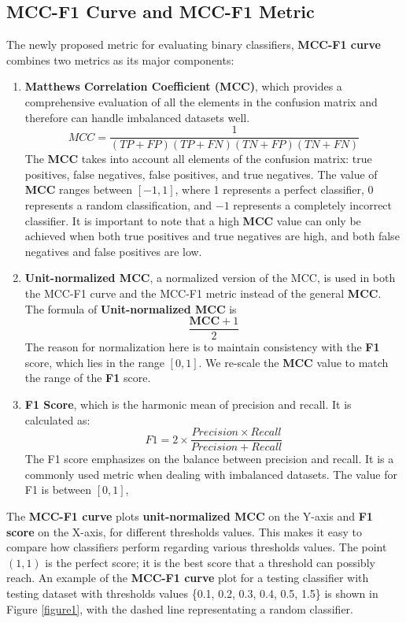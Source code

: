 \documentclass[12pt, oneside]{amsart}
\theoremstyle{definition}
\theoremstyle{remark}
\numberwithin{equation}{section}
\begin{document}
\subsection{MCC-F1 Curve and MCC-F1 Metric}
The newly proposed metric for evaluating binary classifiers, \textbf{MCC-F1 curve} combines two metrics as its major components:
\begin{enumerate}
    \item \textbf{Matthews Correlation Coefficient (MCC)}, which provides a comprehensive evaluation of all the elements in the confusion matrix and therefore can handle imbalanced datasets well. $$ MCC=\frac{1}{(TP+FP)(TP+FN)(TN+FP)(TN+FN)}$$
    The \textbf{MCC} takes into account all elements of the confusion matrix: true positives, false negatives, false positives, and true negatives. The value of \textbf{MCC} ranges between $[-1,1]$, where 1 represents a perfect classifier, 0 represents a random classification, and $-1$ represents a completely incorrect classifier. It is important to note that a high \textbf{MCC} value can only be achieved when both true positives and true negatives are high, and both false negatives and false positives are low. 
    \item \textbf{Unit-normalized MCC}, a normalized version of the MCC, is used in both the MCC-F1 curve and the MCC-F1 metric instead of the general \textbf{MCC}. The formula of \textbf{Unit-normalized MCC} is $$\frac{\textbf{MCC} + 1}{2}$$ The reason for normalization here is to maintain consistency with the \textbf{F1} score, which lies in the range $[0,1]$. We re-scale the \textbf{MCC} value to match the range of the \textbf{F1} score. 
    \item \textbf{F1 Score}, which is the harmonic mean of precision and recall. It is calculated as:
    $$F1=2 \times \frac{Precision \times Recall}{Precision+Recall} $$ The F1 score emphasizes on the balance between precision and recall. It is a commonly used metric when dealing with imbalanced datasets. The value for F1 is between $[0,1]$,
\end{enumerate}

The \textbf{MCC-F1 curve} plots \textbf{unit-normalized MCC} on the Y-axis and \textbf{F1 score} on the X-axis, for different thresholds values. This makes it easy to compare how classifiers perform regarding various thresholds values. The point $(1,1)$  is the perfect score; it is the best score that a threshold can possibly reach. An example of the \textbf{MCC-F1 curve} plot for a testing classifier with testing dataset with thresholds values \{0.1, 0.2, 0.3, 0.4, 0.5, 1.5\} is shown in Figure \ref{figure1}, with the dashed line representating a random classifier.
\end{document}
